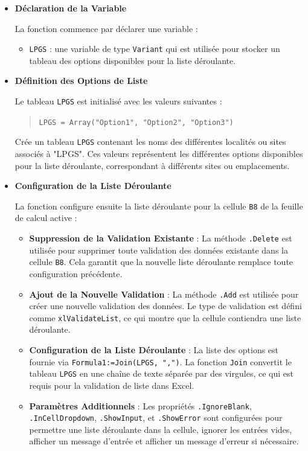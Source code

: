 \documentclass[a4paper, oneside, 12pt, final]{extreport}
\begin{document}
\begin{itemize}
    \item \textbf{Déclaration de la Variable}

    La fonction commence par déclarer une variable :

    \begin{itemize}
        \item \texttt{LPGS} : une variable de type \texttt{Variant} qui est utilisée pour stocker un tableau des options disponibles pour la liste déroulante.
    \end{itemize}

    \item \textbf{Définition des Options de Liste}

    Le tableau \texttt{LPGS} est initialisé avec les valeurs suivantes :

    \begin{quote}
    \texttt{LPGS = Array("Option1", "Option2", "Option3")}
    \end{quote}

    Crée un tableau \texttt{LPGS} contenant les noms des différentes localités ou sites associés à "LPGS". Ces valeurs représentent les différentes options disponibles pour la liste déroulante, correspondant à différents sites ou emplacements.

    \item \textbf{Configuration de la Liste Déroulante}

    La fonction configure ensuite la liste déroulante pour la cellule \texttt{B8} de la feuille de calcul active :

    \begin{itemize}
        \item \textbf{Suppression de la Validation Existante} : La méthode \texttt{.Delete} est utilisée pour supprimer toute validation des données existante dans la cellule \texttt{B8}. Cela garantit que la nouvelle liste déroulante remplace toute configuration précédente.
        \item \textbf{Ajout de la Nouvelle Validation} : La méthode \texttt{.Add} est utilisée pour créer une nouvelle validation des données. Le type de validation est défini comme \texttt{xlValidateList}, ce qui montre que la cellule contiendra une liste déroulante.
        \item \textbf{Configuration de la Liste Déroulante} : La liste des options est fournie via \texttt{Formula1:=Join(LPGS, ",")}. La fonction \texttt{Join} convertit le tableau \texttt{LPGS} en une chaîne de texte séparée par des virgules, ce qui est requis pour la validation de liste dans Excel.
        \item \textbf{Paramètres Additionnels} : Les propriétés \texttt{.IgnoreBlank}, \texttt{.InCellDropdown}, \texttt{.ShowInput}, et \texttt{.ShowError} sont configurées pour permettre une liste déroulante dans la cellule, ignorer les entrées vides, afficher un message d'entrée et afficher un message d'erreur si nécessaire.
    \end{itemize}
\end{itemize}
\end{document}
